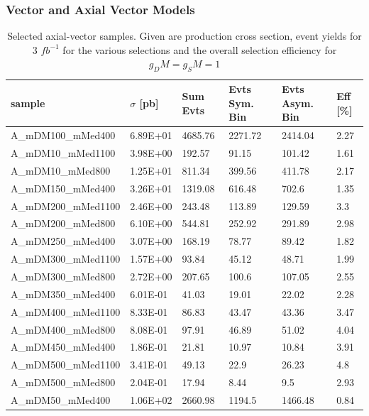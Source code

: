 \subsubsection{Vector and Axial Vector Models}
\begin{table}[h]
\centering
\begin{tabular}{llllll}
\hline
sample             & $\sigma$ [pb] & Sum Evts       & Evts Sym. Bin & Evts Asym. Bin & Eff  [\%]   \\\hline
A\_mDM100\_mMed400  & 6.89E+01 & 4685.76 & 2271.72 & 2414.04 & 2.27 \\
A\_mDM10\_mMed1100  & 3.98E+00 & 192.57  & 91.15   & 101.42  & 1.61 \\
A\_mDM10\_mMed800   & 1.25E+01 & 811.34  & 399.56  & 411.78  & 2.17 \\
A\_mDM150\_mMed400  & 3.26E+01 & 1319.08 & 616.48  & 702.6   & 1.35 \\
A\_mDM200\_mMed1100 & 2.46E+00 & 243.48  & 113.89  & 129.59  & 3.3  \\
A\_mDM200\_mMed800  & 6.10E+00 & 544.81  & 252.92  & 291.89  & 2.98 \\
A\_mDM250\_mMed400  & 3.07E+00 & 168.19  & 78.77   & 89.42   & 1.82 \\
A\_mDM300\_mMed1100 & 1.57E+00 & 93.84   & 45.12   & 48.71   & 1.99 \\
A\_mDM300\_mMed800  & 2.72E+00 & 207.65  & 100.6   & 107.05  & 2.55 \\
A\_mDM350\_mMed400  & 6.01E-01 & 41.03   & 19.01   & 22.02   & 2.28 \\
A\_mDM400\_mMed1100 & 8.33E-01 & 86.83   & 43.47   & 43.36   & 3.47 \\
A\_mDM400\_mMed800  & 8.08E-01 & 97.91   & 46.89   & 51.02   & 4.04 \\
A\_mDM450\_mMed400  & 1.86E-01 & 21.81   & 10.97   & 10.84   & 3.91 \\
A\_mDM500\_mMed1100 & 3.41E-01 & 49.13   & 22.9    & 26.23   & 4.8  \\
A\_mDM500\_mMed800  & 2.04E-01 & 17.94   & 8.44    & 9.5     & 2.93 \\
A\_mDM50\_mMed400   & 1.06E+02 & 2660.98 & 1194.5  & 1466.48 & 0.84\\
\hline
\hline
\end{tabular}
\caption{Selected axial-vector samples. Given are production cross section, event yields for 3 $fb^{-1 }$ for the various selections and the overall selection efficiency for $g_DM=g_SM=1$}
\label{tab:dm_A_g1_3fb}
\end{table}


